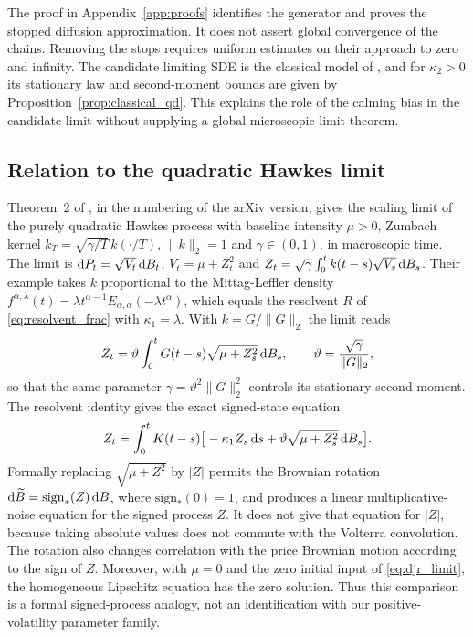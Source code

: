 The proof in Appendix~\ref{app:proofs} identifies the generator and proves the stopped diffusion approximation. It does not assert global convergence of the chains. Removing the stops requires uniform estimates on their approach to zero and infinity. The candidate limiting SDE is the classical model of \citet{SeppRakhmonov2023}, and for $\kappa_2>0$ its stationary law and second-moment bounds are given by Proposition~\ref{prop:classical_qd}. This explains the role of the calming bias in the candidate limit without supplying a global microscopic limit theorem.

\subsection{Relation to the quadratic Hawkes limit}\label{sec:micro_relation}

Theorem~2 of \citet{DandapaniJusselinRosenbaum2021}, in the numbering of the arXiv version, gives the scaling limit of the purely quadratic Hawkes process with baseline intensity $\mu>0$, Zumbach kernel $k_T=\sqrt{\gamma/T}\,k(\cdot/T)$, $\|k\|_2=1$ and $\gamma\in(0,1)$, in macroscopic time. The limit is $\mathrm{d} P_t=\sqrt{V_t}\,\mathrm{d} B_t$, $V_t=\mu+Z_t^2$ and $Z_t=\sqrt\gamma\int_0^tk(t-s)\sqrt{V_s}\,\mathrm{d} B_s$. Their example takes $k$ proportional to the Mittag-Leffler density $f^{\alpha,\lambda}(t)=\lambda t^{\alpha-1}E_{\alpha,\alpha}(-\lambda t^\alpha)$, which equals the resolvent $R$ of \eqref{eq:resolvent_frac} with $\kappa_1=\lambda$. With $k=G/\|G\|_2$ the limit reads
\begin{equation}\label{eq:djr_limit}
Z_t=\vartheta\int_0^tG(t-s)\sqrt{\mu+Z_s^2}\,\D B_s,\qquad \vartheta=\frac{\sqrt\gamma}{\|G\|_2},
\end{equation}
so that the same parameter $\gamma=\vartheta^2\|G\|_2^2$ controls its stationary second moment. The resolvent identity gives the exact signed-state equation
\begin{equation*}
Z_t=\int_0^tK(t-s)\big[-\kappa_1Z_s\,\mathrm{d} s+\vartheta\sqrt{\mu+Z_s^2}\,\mathrm{d} B_s\big].
\end{equation*}
Formally replacing $\sqrt{\mu+Z^2}$ by $|Z|$ permits the Brownian rotation $\mathrm{d}\widetilde B=\mathrm{sign}_*(Z)\,\mathrm{d} B$, where $\mathrm{sign}_*(0)=1$, and produces a linear multiplicative-noise equation for the signed process $Z$. It does not give that equation for $|Z|$, because taking absolute values does not commute with the Volterra convolution. The rotation also changes correlation with the price Brownian motion according to the sign of $Z$. Moreover, with $\mu=0$ and the zero initial input of \eqref{eq:djr_limit}, the homogeneous Lipschitz equation has the zero solution. Thus this comparison is a formal signed-process analogy, not an identification with our positive-volatility parameter family.

